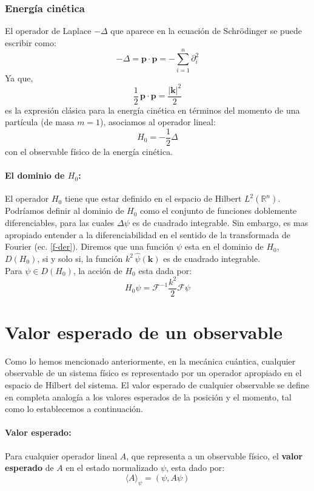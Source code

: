 \documentclass[12pt]{book}
\numberwithin{equation}{chapter}
\def\R{\mathbb{R}}
\def\la{\langle}
\def\ra{\rangle}
\def\F{\mathcal{F}}
\def\k{\mathbf{k}}
\def\P{\mathbf{p}}
\begin{document}
\subsubsection{Energ\'ia cin\'etica}
El operador de Laplace $- \Delta$ que aparece en la ecuaci\'on de Schr\"odinger se puede escribir como:
\begin{equation}
- \Delta = \P \cdot \P = - \sum_{i=1}^{n} \partial_{i}^{2}
\end{equation}
Ya que,
$$ \frac{1}{2}\, \P \cdot \P = \frac{|\k|^{2}}{2} $$
es la expresi\'on cl\'asica para la energ\'ia cin\'etica en t\'erminos del momento de una part\'icula (de masa $m=1$), asociamos al operador lineal:
\begin{equation}\label{H0}
H_{0}= - \frac{1}{2} \Delta
\end{equation}
con el observable f\'isico de la energ\'ia cin\'etica.

\paragraph{El dominio de $H_{0}$:} El operador $H_{0}$ tiene que estar definido en el espacio de Hilbert $L^{2}(\R^{n})$. Podr\'iamos definir al dominio de $H_{0}$
como el conjunto de funciones doblemente diferenciables, para las cuales $\Delta \psi$ es de cuadrado integrable. Sin embargo, es mas apropiado entender a la diferenciabilidad en el sentido de la transformada de Fourier (ec. \eqref{f-der}). Diremos que una funci\'on $\psi$ esta en el dominio de $H_{0}$, $D(H_{0})$, si y solo si, la funci\'on $k^{2} \, \hat{\psi}(\k)$ es de cuadrado integrable.\\
Para $ \psi \in D(H_{0}) $, la acci\'on de $H_{0}$ esta dada por:
\begin{equation}
H_{0} \psi = \F^{-1} \frac{k^{2}}{2} \F \psi
\end{equation}

\section{Valor esperado de un observable}
Como lo hemos mencionado anteriormente, en la mec\'anica cu\'antica, cualquier observable de un sistema f\'isico es representado por un operador apropiado en el espacio de Hilbert del sistema. El valor esperado de cualquier observable se define en completa analog\'ia a los valores esperados de la posici\'on y el momento, tal como lo establecemos a continuaci\'on.

\paragraph{Valor esperado:} 
Para cualquier operador lineal $A$, que representa a un observable f\'isico, el {\bf valor esperado} de $A$ en el estado normalizado $\psi$, esta dado por:
\begin{equation}
\la A \ra_{\psi}= ( \psi , A \psi )
\end{equation}
\end{document}
